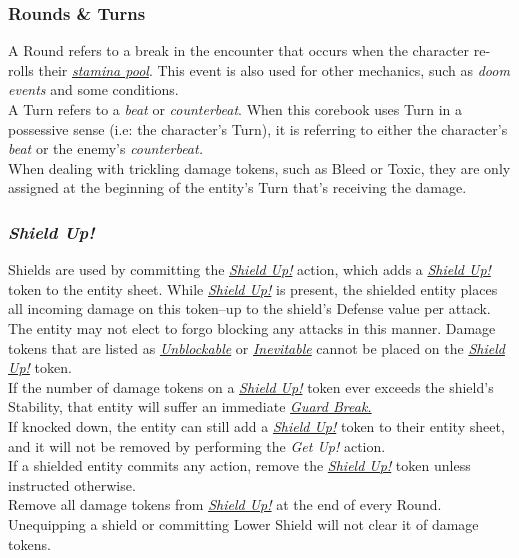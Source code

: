 \documentclass[12pt]{article}
\newcommand{\reftoit}[1]{\hyperlink{#1}{\emph{#1}}}
\begin{document}
\begin{multicols*}{2}
\subsubsection{Rounds \& Turns}
A Round refers to a break in the encounter that occurs when the character re-rolls their \reftoit{stamina pool}. This event is also used for other mechanics, such as \emph{doom events} and some conditions.\\
A Turn refers to a \emph{beat} or \emph{counterbeat}. When this corebook uses Turn in a possessive sense (i.e: the character’s Turn), it is referring to either the character’s \emph{beat} or the enemy’s \emph{counterbeat.}\\
When dealing with trickling damage tokens, such as Bleed or Toxic, they are only assigned at the beginning of the entity’s Turn that’s receiving the damage.

\subsubsection{\emph{Shield Up!}}
\hypertarget{Shield Up!}{}
Shields are used by committing the \reftoit{Shield Up!} action, which adds a \reftoit{Shield Up!} token to the entity sheet. While \reftoit{Shield Up!} is present, the shielded entity places all incoming damage on this token--up to the shield’s Defense value per attack. The entity may not elect to forgo blocking any attacks in this manner. Damage tokens that are listed as \reftoit{Unblockable} or \reftoit{Inevitable} cannot be placed on the \reftoit{Shield Up!} token.\\
If the number of damage tokens on a \reftoit{Shield Up!} token ever exceeds the shield’s Stability, that entity will suffer an immediate \reftoit{Guard Break.}\\
If knocked down, the entity can still add a \reftoit{Shield Up!} token to their entity sheet, and it will not be removed by performing the \emph{Get Up!} action.\\
If a shielded entity commits any action, remove the \reftoit{Shield Up!} token unless instructed otherwise.\\
Remove all damage tokens from \reftoit{Shield Up!} at the end of every Round.\\
Unequipping a shield or committing Lower Shield will not clear it of damage tokens.


\end{multicols*}
\end{document}
